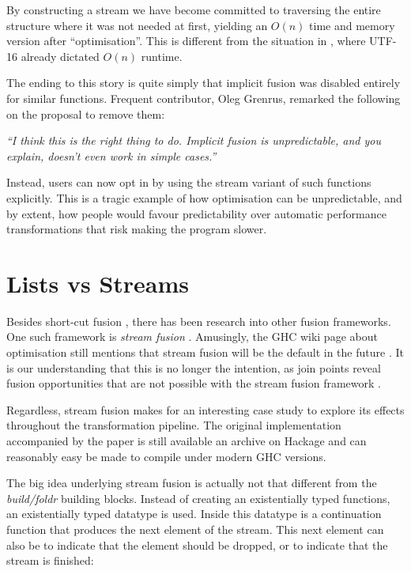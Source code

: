 By constructing a stream we have become committed to traversing the entire structure where it was not needed at first,
yielding an $O(n)$ time and memory version after ``optimisation''. This is different from the situation in ,
where UTF-16 already dictated $O(n)$ runtime.

The ending to this story is quite simply that implicit fusion was disabled entirely \cite{two_tails} for similar functions.
Frequent  contributor, Oleg Grenrus, remarked the following on the proposal to remove them:

\textit{``I think this is the right thing to do. Implicit fusion is unpredictable, and you explain, doesn't even work in simple cases.''}

Instead, users can now opt in by using the stream variant of such functions explicitly. This is a tragic example of how optimisation
can be unpredictable, and by extent, how people would favour predictability over automatic performance transformations that risk making the program slower.

\section{Lists vs Streams}

Besides short-cut fusion \cite{shortcut_fusion}, there has been research into other fusion frameworks. One such framework is \textit{stream fusion} \cite{stream_fusion}.
Amusingly, the GHC wiki page about optimisation still mentions that stream fusion will be the default in the future \cite{ghc_wiki_opt}. It is our understanding
that this is no longer the intention, as join points reveal fusion opportunities that are not possible with the stream fusion framework \cite{compiling_wo_continuations}.

Regardless, stream fusion makes for an interesting case study to explore its effects throughout the transformation pipeline. The original implementation accompanied by
the paper is still available an archive on Hackage and can reasonably easy be made to compile under modern GHC versions.

The big idea underlying stream fusion is actually not that different from the \textit{build/foldr} building blocks. Instead of creating an existentially typed
 functions, an existentially typed datatype is used. Inside this datatype is a continuation function that produces the next element of the stream.
This next element can also be  to indicate that the element should be dropped, or  to indicate that the stream is finished:

